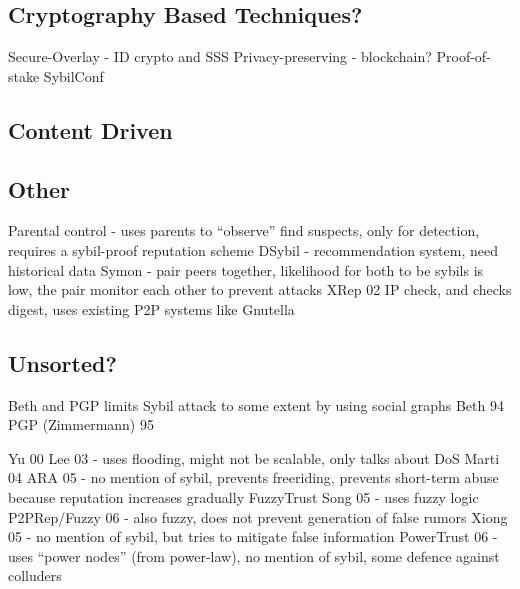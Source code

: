 \subsection{Cryptography Based Techniques?}
Secure-Overlay\cite{lua2007securing} - ID crypto and SSS
Privacy-preserving\cite{schaub2016trustless} - blockchain?
Proof-of-stake\cite{dennis2016rep}
SybilConf\cite{tegeler2010sybilconf}

\subsection{Content Driven}
\cite{chatterjee2008robust}

\subsection{Other}
Parental control\cite{tehale2012parental} - uses parents to ``observe'' find suspects, only for detection, requires a sybil-proof reputation scheme
DSybil\cite{yu2009dsybil} - recommendation system, need historical data
Symon\cite{jyothi2009symon} - pair peers together, likelihood for both to be sybils is low, the pair monitor each other to prevent attacks
XRep 02\cite{damiani2002reputation} IP check, and checks digest, uses existing P2P systems like Gnutella

\subsection{Unsorted?}

Beth and PGP limits Sybil attack to some extent by using social graphs
Beth 94\cite{beth1994valuation}
PGP (Zimmermann) 95\cite{zimmermann1995official}

Yu 00\cite{yu2000social}
Lee 03\cite{lee2003cooperative} - uses flooding, might not be scalable, only talks about DoS
Marti 04\cite{marti2004limited}
ARA 05\cite{ham2005ara} - no mention of sybil, prevents freeriding, prevents short-term abuse because reputation increases gradually
FuzzyTrust Song 05\cite{song2005trusted} - uses fuzzy logic
P2PRep/Fuzzy 06\cite{aringhieri2006fuzzy} - also fuzzy, does not prevent generation of false rumors
Xiong 05\cite{xiong2007countering} - no mention of sybil, but tries to mitigate false information
PowerTrust 06\cite{zhou2007powertrust} - uses ``power nodes'' (from power-law), no mention of sybil, some defence against colluders

